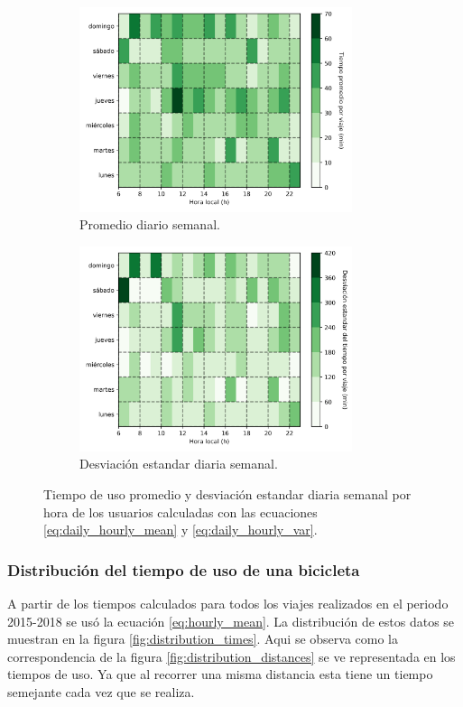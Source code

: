 \begin{figure}[H]
    \centering
    \begin{subfigure}[b]{8cm}
        \includegraphics[width=8cm]{Graphics/daily_hourly_mean_time_travel.png}
        \caption{Promedio diario semanal.}
        \label{fig:daily_hourly_mean_time}
    \end{subfigure}
    \begin{subfigure}[b]{8cm}
        \includegraphics[width=8cm]{Graphics/daily_hourly_var_time_travel.png}
        \caption{Desviación estandar diaria semanal.}
        \label{fig:daily_hourly_var_time}
    \end{subfigure}
    \caption{Tiempo de uso promedio y desviación estandar diaria semanal por hora de los usuarios calculadas con las ecuaciones \ref{eq:daily_hourly_mean} y \ref{eq:daily_hourly_var}.}
    \label{fig:daily_hourly_time}
\end{figure}

\subsubsection{Distribución del tiempo de uso de una bicicleta}

A partir de los tiempos calculados para todos los viajes realizados en el periodo 2015-2018 se usó la ecuación \ref{eq:hourly_mean}. La distribución de estos datos se muestran en la figura \ref{fig:distribution_times}. Aqui se observa como la correspondencia de la figura \ref{fig:distribution_distances} se ve representada en los tiempos de uso. Ya que al recorrer una misma distancia esta tiene un tiempo semejante cada vez que se realiza.

